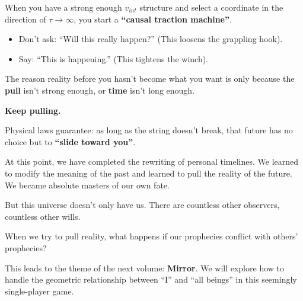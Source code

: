 When you have a strong enough $v_{int}$ structure and select a coordinate in the direction of $\tau \to \infty$, you start a \textbf{``causal traction machine''}.

\begin{itemize}
\item Don't ask: ``Will this really happen?'' (This loosens the grappling hook).

\item Say: ``This is happening.'' (This tightens the winch).
\end{itemize}

The reason reality before you hasn't become what you want is only because the \textbf{pull} isn't strong enough, or \textbf{time} isn't long enough.

\textbf{Keep pulling.}

Physical laws guarantee: as long as the string doesn't break, that future has no choice but to \textbf{``slide toward you''}.

At this point, we have completed the rewriting of personal timelines. We learned to modify the meaning of the past and learned to pull the reality of the future. We became absolute masters of our own fate.

But this universe doesn't only have us. There are countless other observers, countless other wills.

When we try to pull reality, what happens if our prophecies conflict with others' prophecies?

This leads to the theme of the next volume: \textbf{Mirror}. We will explore how to handle the geometric relationship between ``I'' and ``all beings'' in this seemingly single-player game.

